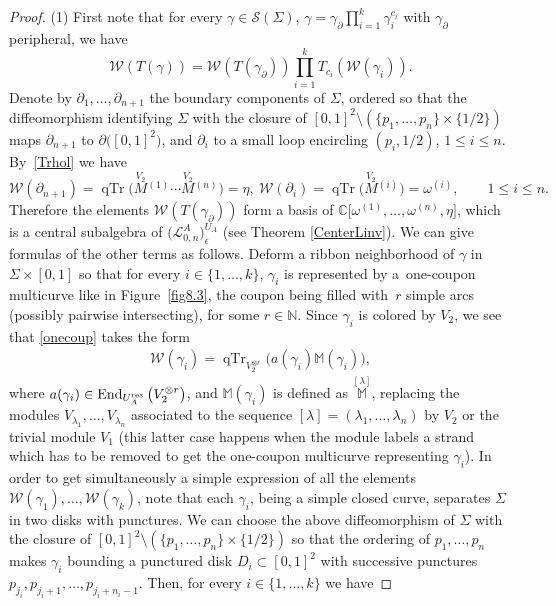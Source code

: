 \documentclass[pdftex]{sigma}%
\numberwithin{equation}{section}
\numberwithin{figure}{section}
\newcommand{\e}{\epsilon}
\newcommand{\mc}{\mathbb{C}}
\newcommand{\mn}{\mathbb{N}}
\newcommand{\Ll}{{\mathcal L}}
\begin{document}
\begin{proof} (1) First note that for every $\gamma\in\mathcal{S}(\Sigma)$, $\textstyle \gamma = \gamma_\partial\prod_{i=1}^k \gamma_i^{c_i}$ with $\gamma_\partial$ peripheral, we have
\begin{equation}\label{exprWT}
\mathcal{W}(T(\gamma)) = \mathcal{W}(T(\gamma_\partial))\prod_{i=1}^k T_{c_i}(\mathcal{W}(\gamma_i)).
\end{equation}
Denote by $\partial_1,\dots,\partial_{n+1}$ the boundary components of $\Sigma$, ordered so that the diffeomorphism identifying $\Sigma$ with the closure of $[0,1]^2\setminus (\{p_1,\dots,p_n\}\times \{1/2\})$ maps $\partial_{n+1}$ to $\partial\big( [0,1]^2\big)$, and $\partial_{i}$ to a small loop encircling $(p_i,1/2)$, $1\leq i\leq n$. By~\eqref{Trhol} we have
\begin{equation}\label{formcentq}
\mathcal{W}(\partial_{n+1}) = \operatorname{qTr}\big(\!\stackrel{V_2}{M}{}^{\!\! (1)}\cdots \stackrel{V_2}{M}{}^{\!\! (n)} \big) = \eta,\ \mathcal{W}(\partial_i) = \operatorname{qTr}\big(\!\stackrel{V_2}{M}{}^{\!\! (i)}\big) = \omega^{(i)}, \qquad 1\leq i\leq n.
\end{equation}
Therefore the elements $\mathcal{W}(T(\gamma_\partial))$ form a basis of $\mc\big[\omega^{(1)},\dots,\omega^{(n)},\eta\big]$, which is a central subalgebra of $\big(\Ll_{0,n}^A\big)^{U_A}_\e$ (see Theorem \ref{CenterLinv}). We can give formulas of the other terms as follows. Deform a ribbon neighborhood of $\gamma$ in $\Sigma\times [0,1]$ so that for every $i\in \{1,\dots,k\}$, $\gamma_i$ is represented by a~one-coupon multicurve like in Figure~\ref{fig8.3}, the coupon being filled with~$r$ simple arcs (possibly pairwise intersecting), for some $r\in \mn$. Since $\gamma_i$ is colored by $V_2$, we see that \eqref{onecoup} takes the form
\begin{gather*}%
\mathcal{W}(\gamma_i) = \operatorname{qTr}_{V_2^{\otimes r}} \big( a(\gamma_i) \mathbb M(\gamma_i)\big),
\end{gather*}
where $a(\gamma_i)\in \operatorname{End}_{U_A^{\rm res}}\big(V_2^{\otimes r}\big)$, and $\mathbb M(\gamma_i)$ is defined as $\stackrel{[\lambda]}{\mathbb{M}}$, replacing the modules $V_{\lambda_1},\dots,V_{\lambda_n}$ associated to the sequence $[\lambda]=(\lambda_1,\dots,\lambda_n)$ by $V_2$ or the trivial module $V_1$ (this latter case happens when the module labels a strand which has to be removed to get the one-coupon multicurve representing $\gamma_i$). In order to get simultaneously a simple expression of all the elements $\mathcal{W}(\gamma_1),\dots, \mathcal{W}(\gamma_k)$, note that each $\gamma_i$, being a simple closed curve, separates $\Sigma$ in two disks with punctures. We can choose the above diffeomorphism of $\Sigma$ with the closure of $[0,1]^2\setminus (\{p_1,\dots,p_n\}\times \{1/2\})$ so that the ordering of $p_1,\dots,p_n$ makes $\gamma_i$ bounding a punctured disk $D_i\subset [0,1]^2$ with successive punctures $p_{j_i}, p_{j_i +1},\dots, p_{j_i + n_i-1}$. Then, for every $i\in \{1,\dots,k\}$ we have

\end{proof}
\end{document}
